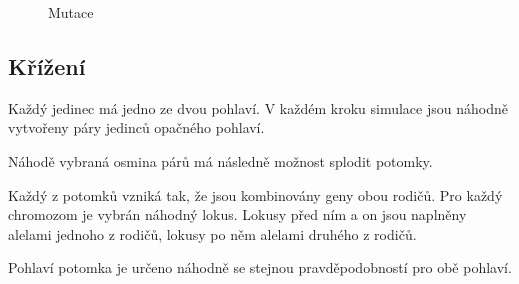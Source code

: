 \begin{figure}
  \centering


  \caption{Mutace}
\end{figure}

\subsection{Křížení}

Každý jedinec má jedno ze dvou pohlaví. V každém kroku simulace jsou náhodně vytvořeny páry jedinců opačného pohlaví.

Náhodě vybraná osmina párů má následně možnost splodit potomky.

Každý z potomků vzniká tak, že jsou kombinovány geny obou rodičů. Pro každý chromozom je vybrán náhodný lokus.
Lokusy před ním a on jsou naplněny alelami jednoho z rodičů, lokusy po něm alelami druhého z rodičů.

Pohlaví potomka je určeno náhodně se stejnou pravděpodobností pro obě pohlaví.

